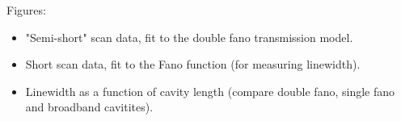 Figures: 
\begin{itemize}
    \item "Semi-short" scan data, fit to the double fano transmission model. 
    \item Short scan data, fit to the Fano function (for measuring linewidth).
    \item Linewidth as a function of cavity length (compare double fano, single fano and broadband cavitites).
\end{itemize}

